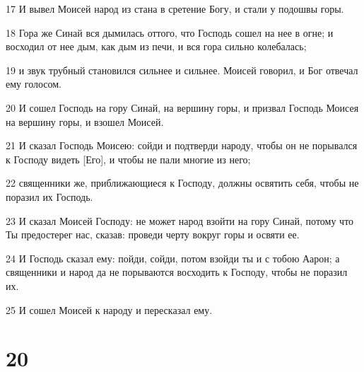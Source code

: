\par 17 И вывел Моисей народ из стана в сретение Богу, и стали у подошвы горы.
\par 18 Гора же Синай вся дымилась оттого, что Господь сошел на нее в огне; и восходил от нее дым, как дым из печи, и вся гора сильно колебалась;
\par 19 и звук трубный становился сильнее и сильнее. Моисей говорил, и Бог отвечал ему голосом.
\par 20 И сошел Господь на гору Синай, на вершину горы, и призвал Господь Моисея на вершину горы, и взошел Моисей.
\par 21 И сказал Господь Моисею: сойди и подтверди народу, чтобы он не порывался к Господу видеть [Его], и чтобы не пали многие из него;
\par 22 священники же, приближающиеся к Господу, должны освятить себя, чтобы не поразил их Господь.
\par 23 И сказал Моисей Господу: не может народ взойти на гору Синай, потому что Ты предостерег нас, сказав: проведи черту вокруг горы и освяти ее.
\par 24 И Господь сказал ему: пойди, сойди, потом взойди ты и с тобою Аарон; а священники и народ да не порываются восходить к Господу, чтобы не поразил их.
\par 25 И сошел Моисей к народу и пересказал ему.

\chapter{20}

